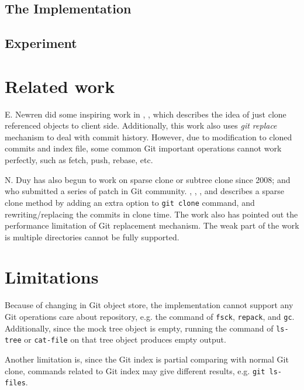\documentclass[preprint]{sigplanconf}
\begin{document}
\subsection{The Implementation}
\subsection{Experiment}


\section{Related work}
E. Newren did some inspiring work in \cite{newren10-0}, \cite{newren10-1},
which describes the idea of just clone referenced objects to client side.
Additionally, this work also uses \emph{git replace} mechanism to deal with
commit history.
However, due to modification to cloned commits and index file, some common Git
important operations cannot work perfectly, such as fetch, push, rebase, etc.

N. Duy has also begun to work on sparse clone or subtree clone since 2008; and
who submitted a series of patch in Git community.
\cite{duy08}, \cite{duy10-1}, \cite{duy10-2}, and \cite{duy10-3} describes a
sparse clone method by adding an extra option to \verb|git clone| command, and
rewriting/replacing the commits in clone time.
The work also has pointed out the performance limitation of Git replacement
mechanism.
The weak part of the work is multiple directories cannot be fully supported.

\section{Limitations}
Because of changing in Git object store, the implementation cannot support
any Git operations care about repository, e.g. the command of \verb|fsck|,
\verb|repack|, and \verb|gc|.
Additionally, since the mock tree object is empty, running the command of
\verb|ls-tree| or \verb|cat-file| on that tree object produces empty output.

Another limitation is, since the Git index is partial comparing with normal Git
clone, commands related to Git index may give different results, e.g.
\verb|git ls-files|.
\end{document}
